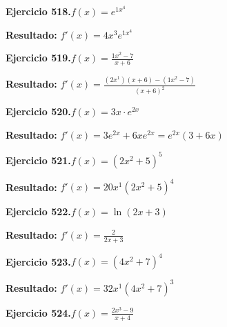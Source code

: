 \documentclass[10pt,a4paper]{article}
\begin{document}
\begin{ejbox}
\textbf{Ejercicio 518.}\quad $f(x) = e^{1x^{4}}$
\end{ejbox}

\begin{solbox}
\textbf{Resultado:} \(\displaystyle f'(x) = 4x^{3}e^{1x^{4}}\)
\end{solbox}

\begin{ejbox}
\textbf{Ejercicio 519.}\quad $f(x) = \frac{1x^{2} -7}{x + 6}$
\end{ejbox}

\begin{solbox}
\textbf{Resultado:} \(\displaystyle f'(x) = \frac{(2x^{1})(x+6) - (1x^{2} -7)}{(x+6)^2}\)
\end{solbox}

\newpage
\begin{ejbox}
\textbf{Ejercicio 520.}\quad $f(x) = 3x \cdot e^{2x}$
\end{ejbox}

\begin{solbox}
\textbf{Resultado:} \(\displaystyle f'(x) = 3e^{2x} + 6xe^{2x} = e^{2x}(3 + 6x)\)
\end{solbox}

\begin{ejbox}
\textbf{Ejercicio 521.}\quad $f(x) = (2x^{2} +5)^{5}$
\end{ejbox}

\begin{solbox}
\textbf{Resultado:} \(\displaystyle f'(x) = 20x^{1}(2x^{2} +5)^{4}\)
\end{solbox}

\begin{ejbox}
\textbf{Ejercicio 522.}\quad $f(x) = \ln(2x + 3)$
\end{ejbox}

\begin{solbox}
\textbf{Resultado:} \(\displaystyle f'(x) = \frac{2}{2x + 3}\)
\end{solbox}

\newpage
\begin{ejbox}
\textbf{Ejercicio 523.}\quad $f(x) = (4x^{2} +7)^{4}$
\end{ejbox}

\begin{solbox}
\textbf{Resultado:} \(\displaystyle f'(x) = 32x^{1}(4x^{2} +7)^{3}\)
\end{solbox}

\begin{ejbox}
\textbf{Ejercicio 524.}\quad $f(x) = \frac{2x^{3} -9}{x + 4}$
\end{ejbox}
\end{document}
